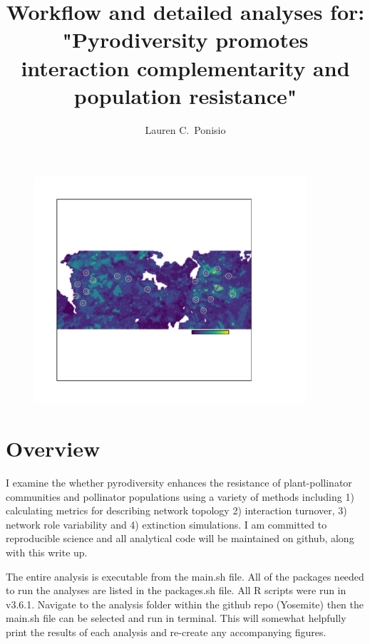 \documentclass{article}\usepackage[]{graphicx}\usepackage[]{color}
\begin{document}
\title{Workflow and detailed analyses for: "Pyrodiversity promotes
  interaction complementarity and population resistance"}
\author{Lauren C.\ Ponisio}
\maketitle

\begin{figure}[h!]
  \centering
  \includegraphics[width=0.9\textwidth]{figure/pyrodiv.pdf}
  \label{fig:pyrodiv}
\end{figure}
\clearpage

\section{Overview}
\label{sec:overview}

I examine the whether pyrodiversity enhances the resistance of
plant-pollinator communities and pollinator populations using a
variety of methods including 1) calculating metrics for describing
network topology 2) interaction turnover, 3) network role variability
and 4) extinction simulations. I am committed to reproducible science
and all analytical code will be maintained on github, along with this
write up.

The entire analysis is executable from the main.sh file. All of the
packages needed to run the analyses are listed in the packages.sh
file. All R scripts were run in v3.6.1. Navigate to the analysis
folder within the github repo (Yosemite) then the main.sh file can be
selected and run in terminal. This will somewhat helpfully print the
results of each analysis and re-create any accompanying figures.
\end{document}
